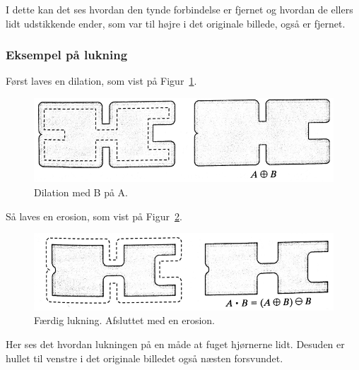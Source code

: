 I dette kan det ses hvordan den tynde forbindelse er fjernet og hvordan de ellers lidt udstikkende ender, som var til højre i det originale billede, også er fjernet.

\subsubsection{Eksempel på lukning}

Først laves en dilation, som vist på Figur~\ref{fig:a-close-b}.

\begin{figure}[H]
	\centering
	\includegraphics[width=0.9\linewidth]{figs/spm09/a-close-b}
	\caption{Dilation med B på A.}
	\label{fig:a-close-b}
\end{figure}

Så laves en erosion, som vist på Figur~\ref{fig:a-close-b-done}.

\begin{figure}[H]
	\centering
	\includegraphics[width=0.9\linewidth]{figs/spm09/a-close-b-done}
	\caption{Færdig lukning. Afsluttet med en erosion.}
	\label{fig:a-close-b-done}
\end{figure}

Her ses det hvordan lukningen på en måde at fuget hjørnerne lidt. Desuden er hullet til venstre i det originale billedet også næsten forsvundet.
